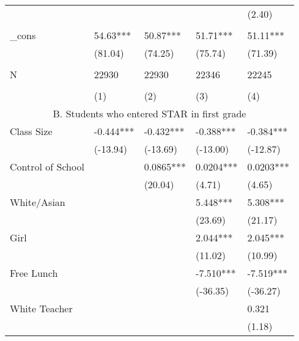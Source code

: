 \documentclass{article}
\begin{document}
{{{{{{{{{{{{{{{{{{\begin{table}[htbp]
\begin{tabular}{lllrr}
          &       &       & \multicolumn{1}{l}{} & \multicolumn{1}{l}{(2.40)} \\
          &       &       &       &  \\
    \_cons & 54.63*** & 50.87*** & \multicolumn{1}{l}{51.71***} & \multicolumn{1}{l}{51.11***} \\
          & (81.04) & (74.25) & \multicolumn{1}{l}{(75.74)} & \multicolumn{1}{l}{(71.39)} \\
          &       &       &       &  \\
    N     & 22930 & 22930 & \multicolumn{1}{l}{22346} & \multicolumn{1}{l}{22245} \\
          &       &       &       &  \\
          & (1)   & (2)   & \multicolumn{1}{l}{(3)} & \multicolumn{1}{l}{(4)} \\
    \midrule
    \multicolumn{5}{c}{B. Students who entered STAR in first grade} \\
    Class Size & -0.444*** & -0.432*** & \multicolumn{1}{l}{-0.388***} & \multicolumn{1}{l}{-0.384***} \\
          & (-13.94) & (-13.69) & \multicolumn{1}{l}{(-13.00)} & \multicolumn{1}{l}{(-12.87)} \\
    Control of School &       & 0.0865*** & \multicolumn{1}{l}{0.0204***} & \multicolumn{1}{l}{0.0203***} \\
          &       & (20.04) & \multicolumn{1}{l}{(4.71)} & \multicolumn{1}{l}{(4.65)} \\
    White/Asian &       &       & \multicolumn{1}{l}{5.448***} & \multicolumn{1}{l}{5.308***} \\
          &       &       & \multicolumn{1}{l}{(23.69)} & \multicolumn{1}{l}{(21.17)} \\
    Girl  &       &       & \multicolumn{1}{l}{2.044***} & \multicolumn{1}{l}{2.045***} \\
          &       &       & \multicolumn{1}{l}{(11.02)} & \multicolumn{1}{l}{(10.99)} \\
    Free Lunch &       &       & \multicolumn{1}{l}{-7.510***} & \multicolumn{1}{l}{-7.519***} \\
          &       &       & \multicolumn{1}{l}{(-36.35)} & \multicolumn{1}{l}{(-36.27)} \\
    White Teacher &       &       & \multicolumn{1}{l}{} & \multicolumn{1}{l}{0.321} \\
          &       &       & \multicolumn{1}{l}{} & \multicolumn{1}{l}{(1.18)} \\

\end{tabular}
\end{table}}}}}}}}}}}}}}}}}}}
\end{document}
